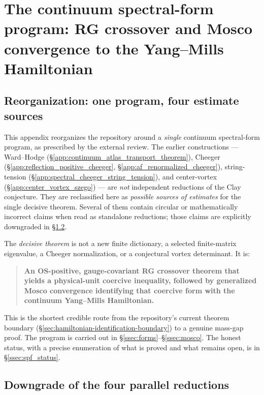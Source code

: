 \section{The continuum spectral-form program: RG crossover and
Mosco convergence to the Yang--Mills Hamiltonian}
\label{app:continuum_spectral_form_program}

\subsection{Reorganization: one program, four estimate sources}
\label{ssec:reorganize}

This appendix reorganizes the repository around a \emph{single}
continuum spectral-form program, as prescribed by the external
review. The earlier constructions --- Ward--Hodge
(\S\ref{app:continuum_atlas_transport_theorem}),
Cheeger (\S\ref{app:reflection_positive_cheeger},
\S\ref{app:af_renormalized_cheeger}),
string-tension (\S\ref{app:spectral_cheeger_string_tension}),
and center-vortex (\S\ref{app:center_vortex_szego}) --- are
\emph{not} independent reductions of the Clay conjecture. They are
reclassified here as \emph{possible sources of estimates} for the
single decisive theorem. Several of them contain circular or
mathematically incorrect claims when read as standalone reductions;
those claims are explicitly downgraded in
\S\ref{ssec:downgrade}.

The \emph{decisive theorem} is not a new finite dictionary, a
selected finite-matrix eigenvalue, a Cheeger normalization, or a
conjectural vortex determinant. It is:
\begin{quote}
\textbf{An OS-positive, gauge-covariant RG crossover theorem that
yields a physical-unit coercive inequality, followed by generalized
Mosco convergence identifying that coercive form with the continuum
Yang--Mills Hamiltonian.}
\end{quote}
This is the shortest credible route from the repository's current
theorem boundary
(\S\ref{sec:hamiltonian-identification-boundary}) to a genuine
mass-gap proof. The program is carried out in
\S\ref{ssec:forms}--\S\ref{ssec:mosco}. The honest status, with a
precise enumeration of what is proved and what remains open, is in
\S\ref{ssec:spf_status}.

\subsection{Downgrade of the four parallel reductions}
\label{ssec:downgrade}

